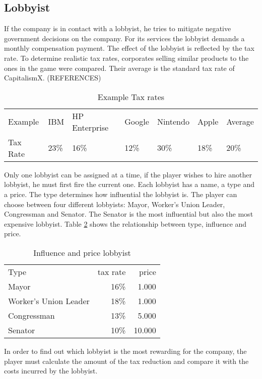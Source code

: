 \subsection{Lobbyist} \label{lobbyist_simulation}
If the company is in contact with a lobbyist, he tries to mitigate negative government decisions on the company. For its services the lobbyist demands a monthly compensation payment. The effect of the lobbyist is reflected by the tax rate. 
To determine realistic tax rates, corporates selling similar products to the ones in the game were compared. Their average is the standard tax rate of CapitalismX. (REFERENCES) \\

\begin{table}[]
\centering
\begin{tabular}{|l|l|l|l|l|l|l|}
\hline
Example & IBM & HP Enterprise & Google & Nintendo & Apple & Average \\
Tax Rate & 23\% & 16\% & 12\% & 30\% & 18\% & 20\% \\ \hline
\end{tabular}
\caption{Example Tax rates}
\label{Example_Tax}
\end{table}

Only one lobbyist can be assigned at a time, if the player wishes to hire another lobbyist, he must first fire the current one. Each lobbyist has a name, a type and a price. The type determines how influential the lobbyist is. The player can choose between four different lobbyists: Mayor, Worker’s Union Leader, Congressman and Senator. The Senator is the most influential but also the most expensive lobbyist. Table \ref{influence_lobbyist} shows the relationship between type, influence and price. \\

\begin{table}[ht]
\centering
\begin{tabular}{|l|r|r|}
\hline
Type                    & tax rate  & price \\
Mayor                   & 16\%      & 1.000     \\
Worker's Union Leader   & 18\%      & 1.000     \\
Congressman             & 13\%      & 5.000     \\
Senator                 & 10\%      & 10.000     \\
\hline
\end{tabular}
\caption{Influence and price lobbyist}
\label{influence_lobbyist}
\end{table}

In order to find out which lobbyist is the most rewarding for the company, the player must calculate the amount of the tax reduction and compare it with the costs incurred by the lobbyist.
 



 




